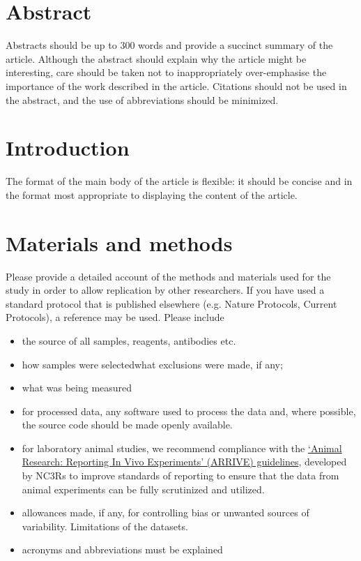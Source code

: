 \documentclass[10pt]{article}
\begin{document}
\section{Abstract}
Abstracts should be up to 300 words and provide a succinct summary of the article. Although the abstract should explain why the article might be interesting, care should be taken not to inappropriately over-emphasise the importance of the work described in the article. Citations should not be used in the abstract, and the use of abbreviations should be minimized.

\section*{Introduction}
The format of the main body of the article is flexible: it should be concise and in the format most appropriate to displaying the content of the article.

\section*{Materials and methods}
Please provide a detailed account of the methods and materials used for the study in order to allow replication by other researchers.
If you have used a standard protocol that is published elsewhere (e.g. Nature Protocols, Current Protocols), a reference may be used. Please include \begin{itemize}
\item
the source of all samples, reagents, antibodies etc.
\item
 how samples were selectedwhat exclusions were made, if any;
\item
what was being measured
\item
for processed data, any software used to process the data and, where possible, the source code should be made openly available.\item

for laboratory animal studies, we recommend compliance with the \href{http://www.nc3rs.org.uk/downloaddoc.asp?id=1206&page=1357&skin=0}{`Animal Research: Reporting In Vivo Experiments' (ARRIVE) guidelines}, developed by NC3Rs to improve standards of reporting to ensure that the data from animal experiments can be fully scrutinized and utilized.\item

allowances made, if any, for controlling bias or unwanted sources of variability.
Limitations of the datasets.\item

acronyms and abbreviations must be explained
\end{itemize}
\end{document}
